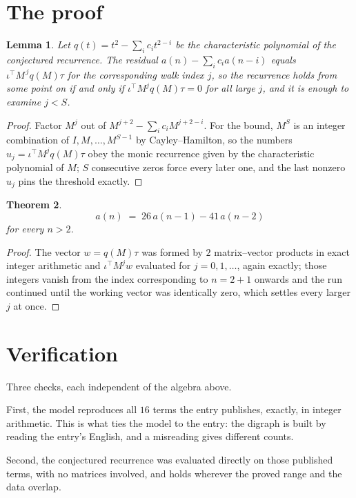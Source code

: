 \documentclass[11pt,a4paper]{article}
\theoremstyle{plain}
\newtheorem{theorem}{Theorem}
\newtheorem{lemma}[theorem]{Lemma}
\theoremstyle{definition}
\begin{document}
\section{The proof}

\begin{lemma}\label{lem:crit}
Let $q(t)=t^{2}-\sum_i c_it^{2-i}$ be the characteristic polynomial of the
conjectured recurrence. The residual $a(n)-\sum_ic_ia(n-i)$ equals
$\iota^{\!\top}M^{\,j}q(M)\tau$ for the corresponding walk index $j$, so the recurrence
holds from some point on if and only if $\iota^{\!\top}M^{j}q(M)\tau=0$ for all large $j$,
and it is enough to examine $j<S$.
\end{lemma}

\begin{proof}
Factor $M^{j}$ out of $M^{j+2}-\sum_ic_iM^{j+2-i}$. For the bound, $M^{S}$
is an integer combination of $I,M,\dots,M^{S-1}$ by Cayley--Hamilton, so the numbers
$u_j=\iota^{\!\top}M^{j}q(M)\tau$ obey the monic recurrence given by the characteristic
polynomial of $M$; $S$ consecutive zeros force every later one, and the last nonzero $u_j$
pins the threshold exactly.
\end{proof}

\begin{theorem}
\[
a(n)\;=\;26\,a(n-1) - 41\,a(n-2)
\]
for every $n>2$.
\end{theorem}

\begin{proof}
The vector $w=q(M)\tau$ was formed by $2$ matrix--vector products in exact integer
arithmetic and $\iota^{\!\top}M^{j}w$ evaluated for $j=0,1,\dots$, again exactly; those
integers vanish from the index corresponding to $n=2+1$ onwards and the run continued
until the working vector was identically zero, which settles every larger $j$ at once.
\end{proof}

\section{Verification}

Three checks, each independent of the algebra above.

First, the model reproduces all $16$ terms the entry publishes, exactly, in integer
arithmetic. This is what ties the model to the entry: the digraph is built by reading the
entry's English, and a misreading gives different counts.

Second, the conjectured recurrence was evaluated directly on those published terms, with no
matrices involved, and holds wherever the proved range and the data overlap.
\end{document}
